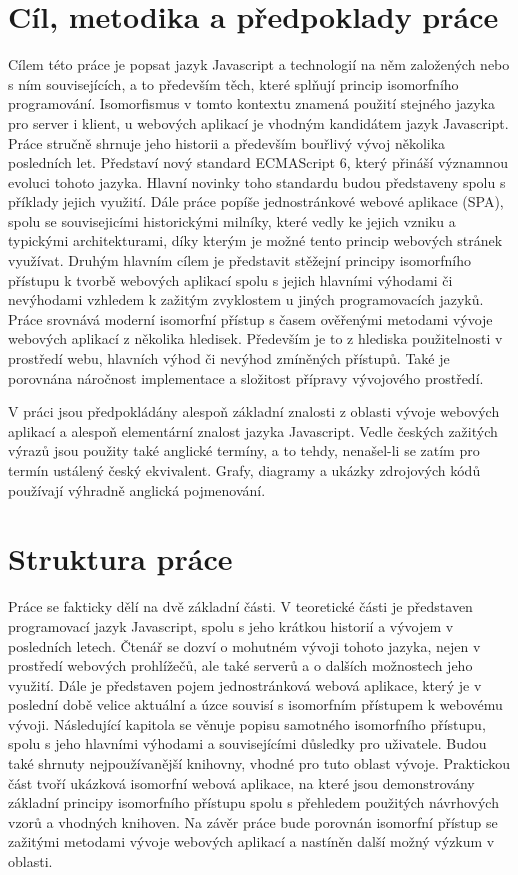 \section{Cíl, metodika a předpoklady práce}
Cílem této práce je popsat jazyk Javascript a technologií na něm založených nebo s ním souvisejících, a to především těch, které splňují princip isomorfního programování. Isomorfismus v tomto kontextu znamená použití stejného jazyka pro server i klient, u webových aplikací je vhodným kandidátem jazyk Javascript. Práce stručně shrnuje jeho historii a především bouřlivý vývoj několika posledních let. Představí nový standard ECMAScript 6, který přináší významnou evoluci tohoto jazyka. Hlavní novinky toho standardu budou představeny spolu s příklady jejich využití. Dále práce popíše jednostránkové webové aplikace (SPA), spolu se souvisejicími historickými milníky, které vedly ke jejich vzniku a typickými architekturami, díky kterým je možné tento princip webových stránek využívat. Druhým hlavním cílem je představit stěžejní principy isomorfního přístupu k tvorbě webových aplikací spolu s jejich hlavními výhodami či nevýhodami vzhledem k zažitým zvyklostem u jiných programovacích jazyků. Práce srovnává moderní isomorfní přístup s časem ověřenými metodami vývoje webových aplikací z několika hledisek. Především je to z hlediska použitelnosti v prostředí webu, hlavních výhod či nevýhod zmíněných přístupů. Také je porovnána náročnost implementace a složitost přípravy vývojového prostředí.

V práci jsou předpokládány alespoň základní znalosti z oblasti vývoje webových aplikací a alespoň elementární znalost jazyka Javascript. Vedle českých zažitých výrazů jsou použity také anglické termíny, a to tehdy, nenašel-li se zatím pro termín ustálený český ekvivalent. Grafy, diagramy a ukázky zdrojových kódů používají výhradně anglická pojmenování.

\section{Struktura práce}
Práce se fakticky dělí na dvě základní části. V teoretické části je představen programovací jazyk Javascript, spolu s jeho krátkou historií a vývojem v posledních letech. Čtenář se dozví o mohutném vývoji tohoto jazyka, nejen v prostředí webových prohlížečů, ale také serverů a o dalších možnostech jeho využití. Dále je představen pojem jednostránková webová aplikace, který je v poslední době velice aktuální a úzce souvisí s isomorfním přístupem k webovému vývoji. Následující kapitola se věnuje popisu samotného isomorfního přístupu, spolu s jeho hlavními výhodami a souvisejícími důsledky pro uživatele.
Budou také shrnuty nejpoužívanější knihovny, vhodné pro tuto oblast vývoje. 
Praktickou část tvoří ukázková isomorfní webová aplikace, na které jsou demonstrovány základní principy isomorfního přístupu spolu s přehledem použitých návrhových vzorů a vhodných knihoven. Na závěr práce bude porovnán isomorfní přístup se zažitými metodami vývoje webových aplikací a nastíněn další možný výzkum v oblasti.

